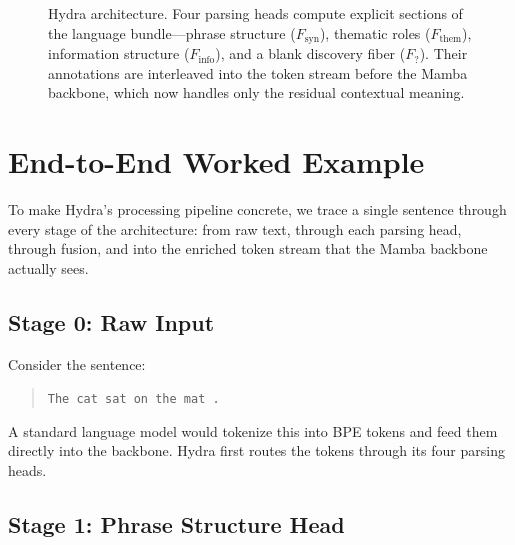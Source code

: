 \documentclass[11pt]{article}
\begin{document}
\begin{figure}[h]
\caption{Hydra architecture. Four parsing heads compute explicit 
sections of the language bundle---phrase structure ($F_{\text{syn}}$), 
thematic roles ($F_{\text{them}}$), information structure 
($F_{\text{info}}$), and a blank discovery fiber ($F_{\text{?}}$). 
Their annotations are interleaved into the token stream before the 
Mamba backbone, which now handles only the residual contextual meaning.}
\label{fig:hydra-arch}
\end{figure}

\section{End-to-End Worked Example}
\label{app:walkthrough}

To make Hydra's processing pipeline concrete, we trace a single 
sentence through every stage of the architecture: from raw text, 
through each parsing head, through fusion, and into the enriched 
token stream that the Mamba backbone actually sees.

\subsection*{Stage 0: Raw Input}

Consider the sentence:

\begin{quote}
\texttt{The cat sat on the mat .}
\end{quote}

A standard language model would tokenize this into BPE tokens and 
feed them directly into the backbone. Hydra first routes the tokens 
through its four parsing heads.

\subsection*{Stage 1: Phrase Structure Head}
\end{document}
